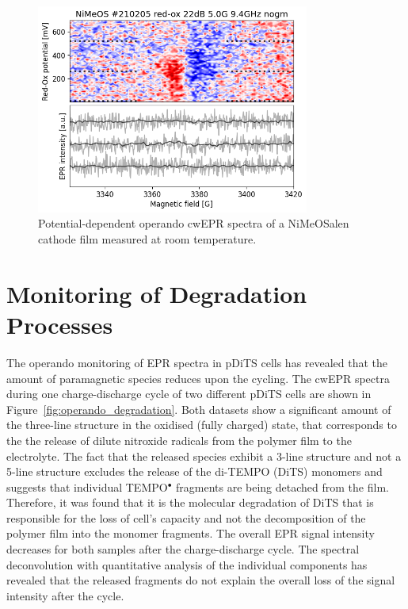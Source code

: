 \begin{figure}[!ht]
\center
	\includegraphics[width=0.8\textwidth]{./operando_epr/figures/backbone/NiMeOS_lyra_overnight_RT.png}
	\caption{Potential-dependent operando cwEPR spectra of a NiMeOSalen cathode film measured at room temperature.}
	\label{fig:cwEPR_RT_NiSalen_OPERANDO}
\end{figure}

\section{Monitoring of Degradation Processes}
\label{Degradation_study}
The operando monitoring of EPR spectra in pDiTS cells has revealed that the amount of paramagnetic species reduces upon the cycling. The cwEPR spectra during one charge-discharge cycle of two different pDiTS cells are shown in Figure~\ref{fig:operando_degradation}. Both datasets show a significant amount of the three-line structure in the oxidised (fully charged) state, that corresponds to the the release of dilute nitroxide radicals from the polymer film to the electrolyte. The fact that the released species exhibit a 3-line structure and not a 5-line structure excludes the release of the di-TEMPO (DiTS) monomers and suggests that individual TEMPO$^{\bullet}$ fragments are being detached from the film. Therefore, it was found that it is the molecular degradation of DiTS that is responsible for the loss of cell's capacity and not the decomposition of the polymer film into the monomer fragments. The overall EPR signal intensity decreases for both samples after the charge-discharge cycle. The spectral deconvolution with quantitative analysis of the individual components has revealed that the released fragments do not explain the overall loss of the signal intensity after the cycle.\\


